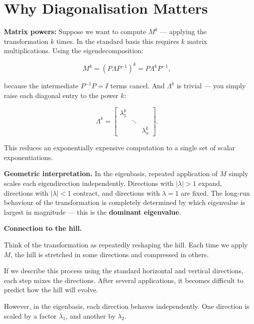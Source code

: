 \documentclass[11pt,openany]{book}
\theoremstyle{definition}
\begin{document}
\section{Why Diagonalisation Matters}

\textbf{Matrix powers:} Suppose we want to compute $M^k$ --- applying the
transformation $k$ times. In the standard basis this requires $k$ matrix
multiplications. Using the eigendecomposition:

\[
M^k = (P\Lambda P^{-1})^k = P \Lambda^k P^{-1},
\]

because the intermediate $P^{-1}P = I$ terms cancel. And $\Lambda^k$ is trivial
--- you simply raise each diagonal entry to the power $k$:

\[
\Lambda^k = \begin{bmatrix} \lambda_1^k & & \\ & \ddots & \\ & & \lambda_n^k \end{bmatrix}.
\]

This reduces an exponentially expensive computation to a single set of scalar
exponentiations.

\medskip

\textbf{Geometric interpretation.} In the eigenbasis, repeated application of $M$
simply scales each eigendirection independently. Directions with $|\lambda| > 1$
expand, directions with $|\lambda| < 1$ contract, and directions with $\lambda = 1$
are fixed. The long-run behaviour of the transformation is completely determined by
which eigenvalue is largest in magnitude --- this is the \textbf{dominant eigenvalue}.

\medskip

\textbf{Connection to the hill.}

\medskip

Think of the transformation as repeatedly reshaping the hill. Each time we apply $M$,
the hill is stretched in some directions and compressed in others.

\medskip

If we describe this process using the standard horizontal and vertical directions,
each step mixes the directions. After several applications, it becomes difficult to
predict how the hill will evolve.

\medskip

However, in the eigenbasis, each direction behaves independently. One direction
is scaled by a factor $\lambda_1$, and another by $\lambda_2$.
\end{document}
